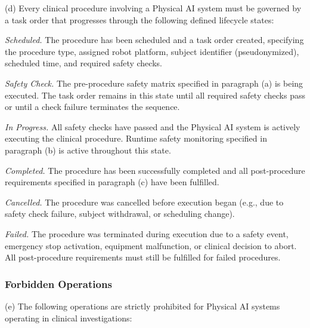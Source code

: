 (d) Every clinical procedure involving a Physical AI system must be governed by a task order that progresses through the following defined lifecycle states:

\begin{description}[leftmargin=1.0cm,style=sameline]
\item[(1)] \textit{Scheduled.} The procedure has been scheduled and a task order created, specifying the procedure type, assigned robot platform, subject identifier (pseudonymized), scheduled time, and required safety checks.
\item[(2)] \textit{Safety Check.} The pre-procedure safety matrix specified in paragraph (a) is being executed. The task order remains in this state until all required safety checks pass or until a check failure terminates the sequence.
\item[(3)] \textit{In Progress.} All safety checks have passed and the Physical AI system is actively executing the clinical procedure. Runtime safety monitoring specified in paragraph (b) is active throughout this state.
\item[(4)] \textit{Completed.} The procedure has been successfully completed and all post-procedure requirements specified in paragraph (c) have been fulfilled.
\item[(5)] \textit{Cancelled.} The procedure was cancelled before execution began (e.g., due to safety check failure, subject withdrawal, or scheduling change).
\item[(6)] \textit{Failed.} The procedure was terminated during execution due to a safety event, emergency stop activation, equipment malfunction, or clinical decision to abort. All post-procedure requirements must still be fulfilled for failed procedures.
\end{description}

\subsubsection{Forbidden Operations}

(e) The following operations are strictly prohibited for Physical AI systems operating in clinical investigations:

